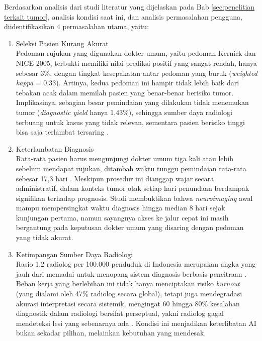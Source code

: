 Berdasarkan analisis dari studi literatur yang dijelaskan pada Bab \ref{sec:penelitian terkait tumor}, analisis kondisi saat ini, dan analisis permasalahan pengguna, diidentifikasikan 4 permasalahan utama, yaitu:

\begin{enumerate}
	\item Seleksi Pasien Kurang Akurat \\
	Pedoman rujukan yang digunakan dokter umum, yaitu pedoman Kernick dan NICE 2005, terbukti memiliki nilai prediksi positif yang sangat rendah, hanya sebesar 3\%, dengan tingkat kesepakatan antar pedoman yang buruk (\textit{weighted kappa} = 0,33). Artinya, kedua pedoman ini hampir tidak lebih baik dari tebakan acak dalam memilah pasien yang benar-benar berisiko tumor. Implikasinya, sebagian besar pemindaian yang dilakukan tidak menemukan tumor (\textit{diagnostic yield} hanya 1,43\%), sehingga sumber daya radiologi terbuang untuk kasus yang tidak relevan, sementara pasien berisiko tinggi bisa saja terlambat tersaring \cite{zienius2019direct}.
	
	\item Keterlambatan Diagnosis \\
	Rata-rata pasien harus mengunjungi dokter umum tiga kali atau lebih sebelum mendapat rujukan, ditambah waktu tunggu pemindaian rata-rata sebesar 17,3 hari \cite{zienius2019direct}. Meskipun prosedur ini dianggap wajar secara administratif, dalam konteks tumor otak setiap hari penundaan berdampak signifikan terhadap prognosis. Studi \textcite{carey2019impact} membuktikan bahwa \textit{neuroimaging} awal mampu mempersingkat waktu diagnosis hingga median 8 hari sejak kunjungan pertama, namun sayangnya akses ke jalur cepat ini masih bergantung pada keputusan dokter umum yang disaring dengan pedoman yang tidak akurat.
	
	\item Ketimpangan Sumber Daya Radiologi \\
	Rasio 1,2 radiolog per 100.000 penduduk di Indonesia merupakan angka yang jauh dari memadai untuk menopang sistem diagnosis berbasis pencitraan \autocite{insights102023indonesia}. Beban kerja yang berlebihan ini tidak hanya menciptakan risiko \textit{burnout} (yang dialami oleh 47\% radiolog secara global), tetapi juga mendegradasi akurasi interpretasi secara sistemik, mengingat 60 hingga 80\% kesalahan diagnostik dalam radiologi bersifat perseptual, yakni radiolog gagal mendeteksi lesi yang sebenarnya ada \cite{zhang2023diagnostic}. Kondisi ini menjadikan keterlibatan AI bukan sekadar pilihan, melainkan kebutuhan yang mendesak.
	

\end{enumerate}
